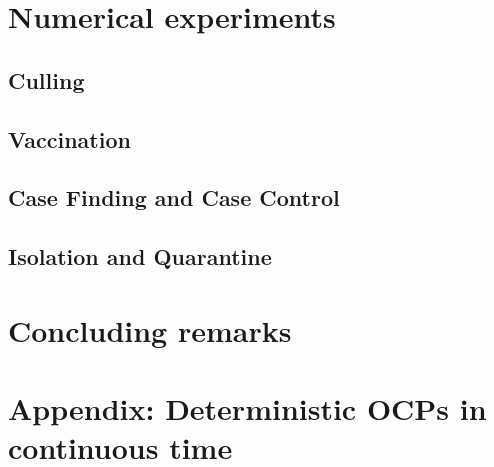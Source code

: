 \documentclass[titlepage]{amsart}
\begin{document}
  \section{Numerical experiments}
    \subsection{Culling}
      
    \subsection{Vaccination}
      
    \subsection{Case Finding and Case Control}
      
    \subsection{Isolation and Quarantine}
      

%
%
  \section{Concluding remarks}
   
  \section{Appendix: Deterministic OCPs in continuous time}
    
%
%
  
  
\end{document}
